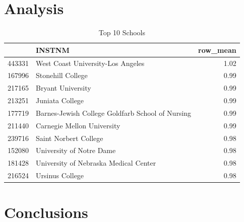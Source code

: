 \documentclass[a4paper]{article}\usepackage[]{graphicx}\usepackage[]{color}
\begin{document}
\section{Analysis}

\begin{table}[!h]
\centering
\caption{Top 10 Schools} 
\begin{tabular}{rlr}
  \hline
 & INSTNM & row\_mean \\ 
  \hline
443331 & West Coast University-Los Angeles & 1.02 \\ 
  167996 & Stonehill College & 0.99 \\ 
  217165 & Bryant University & 0.99 \\ 
  213251 & Juniata College & 0.99 \\ 
  177719 & Barnes-Jewish College Goldfarb School of Nursing & 0.99 \\ 
  211440 & Carnegie Mellon University & 0.99 \\ 
  239716 & Saint Norbert College & 0.98 \\ 
  152080 & University of Notre Dame & 0.98 \\ 
  181428 & University of Nebraska Medical Center & 0.98 \\ 
  216524 & Ursinus College & 0.98 \\ 
   \hline
\end{tabular}
\end{table}

\section{Conclusions}
\end{document}
